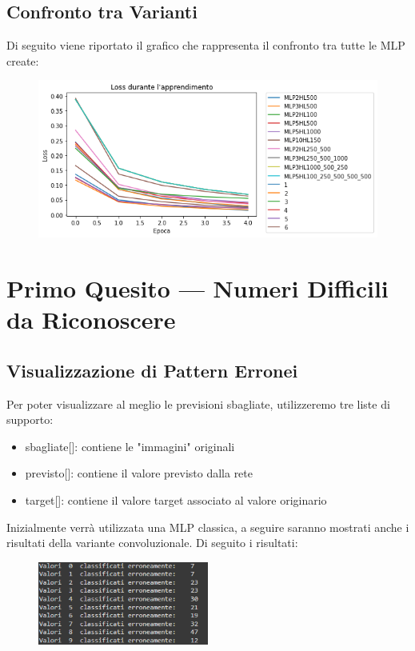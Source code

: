 \documentclass[12pt, a4paper]{article}
\begin{document}
\subsection{Confronto tra Varianti}
Di seguito viene riportato il grafico che rappresenta il confronto tra tutte le MLP create:
\begin{figure}[H]
    \centering
    \includegraphics[width=\textwidth]{ConfrontoTotale.png}
\end{figure}

\newpage
\section{Primo Quesito --- Numeri Difficili da Riconoscere}
\subsection{Visualizzazione di Pattern Erronei}
Per poter visualizzare al meglio le previsioni sbagliate, utilizzeremo tre liste di supporto:
\begin{itemize}
    \item sbagliate[]: contiene le "immagini" originali
    \item previsto[]: contiene il valore previsto dalla rete
    \item target[]: contiene il valore target associato al valore originario
\end{itemize}

Inizialmente verrà utilizzata una MLP classica, a seguire saranno mostrati anche i risultati della variante convoluzionale.
Di seguito i risultati:
\begin{figure}[H]
    \centering
    \includegraphics[width=0.50\textwidth]{ErrateClassica.png}
\end{figure}
\end{document}
